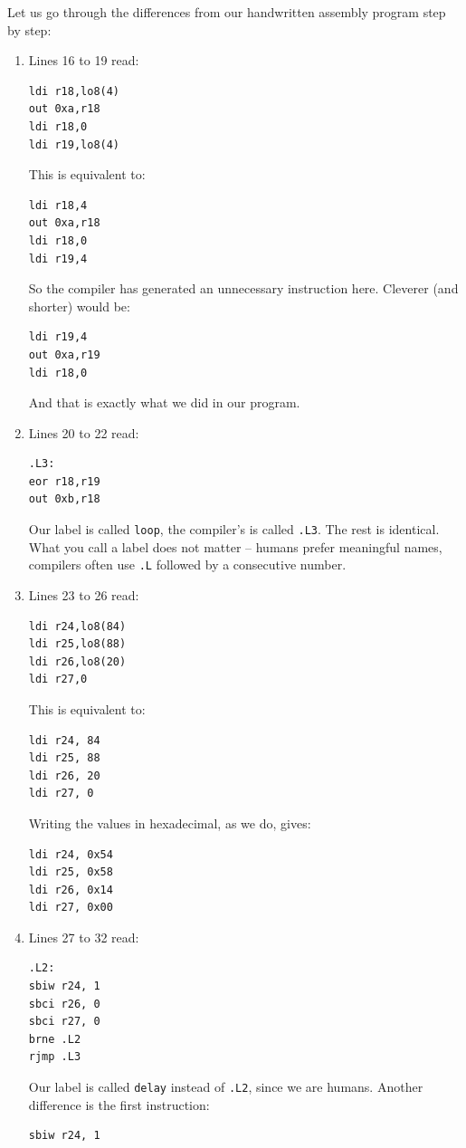 \documentclass[a4paper,12pt]{article}
\begin{document}
\noindent
Let us go through the differences from our handwritten assembly program step
by step:

\begin{enumerate}
\item
Lines 16 to 19 read:
\begin{lstlisting}[language={[x86masm]Assembler}]
ldi r18,lo8(4)
out 0xa,r18
ldi r18,0
ldi r19,lo8(4)
\end{lstlisting}

\newpage
\noindent
This is equivalent to:
\begin{lstlisting}[language={[x86masm]Assembler}]
ldi r18,4
out 0xa,r18
ldi r18,0
ldi r19,4
\end{lstlisting}
So the compiler has generated an unnecessary instruction here. Cleverer (and
shorter) would be:
\begin{lstlisting}[language={[x86masm]Assembler}]
ldi r19,4
out 0xa,r19
ldi r18,0
\end{lstlisting}
And that is exactly what we did in our program.

\item
Lines 20 to 22 read:
\begin{lstlisting}[language={[x86masm]Assembler}]
.L3:
eor r18,r19
out 0xb,r18
\end{lstlisting}
Our label is called \texttt{loop}, the compiler's is called \texttt{.L3}. The
rest is identical. What you call a label does not matter – humans prefer
meaningful names, compilers often use \texttt{.L} followed by a consecutive
number.

\item
Lines 23 to 26 read:
\begin{lstlisting}[language={[x86masm]Assembler}]
ldi r24,lo8(84)
ldi r25,lo8(88)
ldi r26,lo8(20)
ldi r27,0
\end{lstlisting}
This is equivalent to:
\begin{lstlisting}[language={[x86masm]Assembler}]
ldi r24, 84
ldi r25, 88
ldi r26, 20
ldi r27, 0
\end{lstlisting}
Writing the values in hexadecimal, as we do, gives:
\begin{lstlisting}[language={[x86masm]Assembler}]
ldi r24, 0x54
ldi r25, 0x58
ldi r26, 0x14
ldi r27, 0x00
\end{lstlisting}

\item
Lines 27 to 32 read:
\begin{lstlisting}[language={[x86masm]Assembler}]
.L2:
sbiw r24, 1
sbci r26, 0
sbci r27, 0
brne .L2
rjmp .L3
\end{lstlisting}
\newpage
\noindent
Our label is called \texttt{delay} instead of \texttt{.L2}, since we are
humans. Another difference is the first instruction:
\begin{lstlisting}[language={[x86masm]Assembler}]
sbiw r24, 1
\end{lstlisting}


\end{enumerate}
\end{document}
